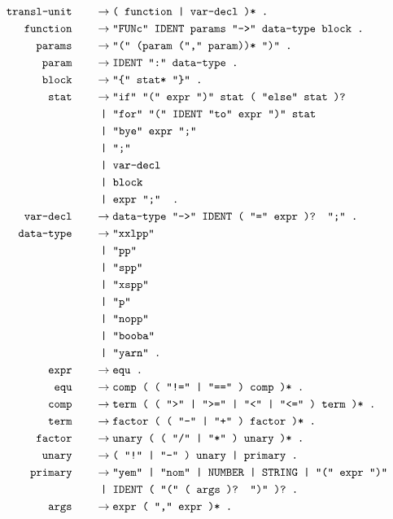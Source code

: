 \documentclass[12pt, a4paper]{article}
\newcommand{\ttt}[1]{
    \text{\texttt{#1}}
}
\newcommand{\ebnfnode}[2]{%
    #1\hspace{20px} &\to #2\ttt{ .}\\
}
\newcommand{\ebnfnodett}[2]{%
    \ebnfnode{\ttt{#1}}{\ttt{#2}}
}
\begin{document}
    \begin{align*}
        \ebnfnodett{transl-unit}{( function | var-decl )*}
        \ebnfnodett{function}{"FUNc" IDENT params "->" data-type block}
        \ebnfnodett{params}{"(" (param ("," param))* ")"}
        \ebnfnodett{param}{IDENT ":" data-type}
        \ebnfnodett{block}{"\{" stat* "\}"}
        \ebnfnode{\ttt{stat}}
        {%
            \ttt{"if" "(" expr ")" stat ( "else" stat )?}\\
            &\ttt{ | "for" "(" IDENT "to" expr ")" stat }\\
            &\ttt{ | "bye" expr ";" }\\
            &\ttt{ | ";" }\\
            &\ttt{ | var-decl }\\
            &\ttt{ | block }\\
            &\ttt{ | expr ";" }
        }
        \ebnfnodett{var-decl}{data-type "->" IDENT ( "=" expr )? ";"}
        \ebnfnode{\ttt{data-type}}
        {%
            \ttt{"xxlpp"}\\
            &\ttt{ | "pp"}\\
            &\ttt{ | "spp"}\\
            &\ttt{ | "xspp"}\\
            &\ttt{ | "p"}\\
            &\ttt{ | "nopp"}\\
            &\ttt{ | "booba"}\\
            &\ttt{ | "yarn"}
        }
        \ebnfnodett{expr}{equ}
        \ebnfnodett{equ}{comp ( ( "!=" | "==" ) comp )*}
        \ebnfnodett{comp}{term ( ( ">" | ">=" | "<" | "<=" ) term )*}
        \ebnfnodett{term}{factor ( ( "-" | "+" ) factor )*}
        \ebnfnodett{factor}{unary ( ( "/" | "*" ) unary )*}
        \ebnfnodett{unary}{( "!" | "-" ) unary | primary}
        \ebnfnode{\ttt{primary}}
        {%
            \ttt{"yem" | "nom" | NUMBER | STRING | "(" expr ")"}\\
            &\ttt{ | IDENT ( "(" ( args )? ")" )?}
        }
        \ebnfnodett{args}{expr ( "," expr )*}
    \end{align*}
\end{document}

